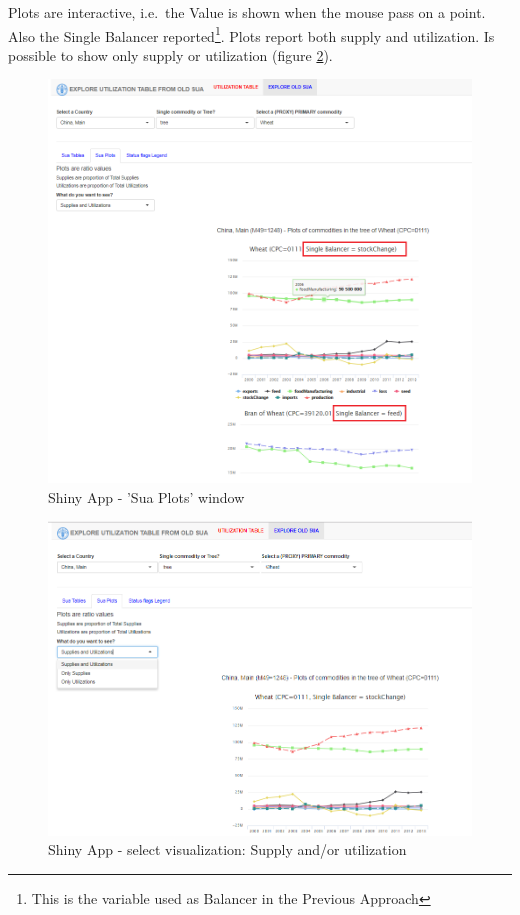 \documentclass[]{article}
\let\rmarkdownfootnote\footnote%
\def\footnote{\protect\rmarkdownfootnote}
\begin{document}
Plots are interactive, i.e.~the Value is shown when the mouse pass on a
point. Also the Single Balancer reported\footnote{This is the variable
  used as Balancer in the Previous Approach}. Plots report both supply
and utilization. Is possible to show only supply or utilization (figure
\ref{fig:f14}).

\begin{figure}[H]

{\centering \includegraphics[width=1\linewidth]{images/UtilizationTable/13_treePlotVisual} 

}

\caption{\label{fig:f13}Shiny App - 'Sua Plots' window}\label{fig:f13}
\end{figure}

\begin{figure}[H]

{\centering \includegraphics[width=1\linewidth]{images/UtilizationTable/14_selectsupUtil} 

}

\caption{\label{fig:f14}Shiny App - select visualization: Supply and/or utilization}\label{fig:f14}
\end{figure}
\end{document}
